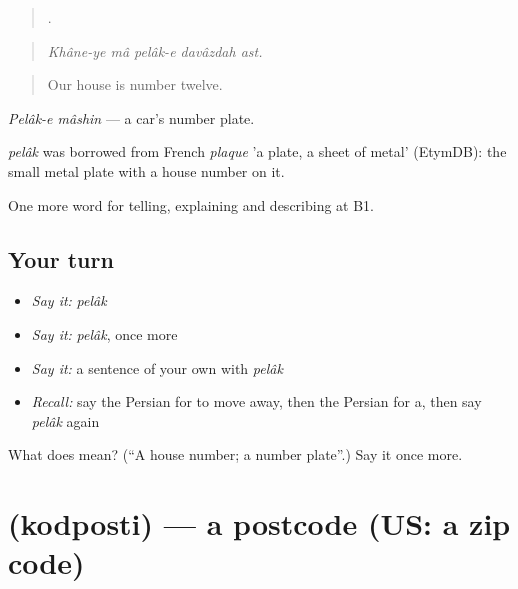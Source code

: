 \begin{quote}
    .
\end{quote}

\begin{quote}
\emph{Khâne-ye mâ pelâk-e davâzdah ast.}
\end{quote}

\begin{quote}
Our house is number twelve.
\end{quote}

\emph{Pelâk-e mâshin} — a car's number plate.

\begin{cousinweb}
\emph{pelâk} was borrowed from French \emph{plaque} 'a plate, a sheet of metal' (EtymDB): the small metal plate with a house number on it.
\end{cousinweb}

\begin{grammarlens}[title={What you've built}]
One more word for telling, explaining and describing at B1.
\end{grammarlens}

\subsection*{Your turn}
\begin{itemize}
\raggedright
  \item \emph{Say it:} \emph{pelâk}
  \item \emph{Say it:} \emph{pelâk}, once more
  \item \emph{Say it:} a sentence of your own with \emph{pelâk}
  \item \emph{Recall:} say the Persian for to move away, then the Persian for a, then say \emph{pelâk} again
\end{itemize}

\begin{tcolorbox}[breakable,colback=teal!4,colframe=teal!35!black,title={Before you move on}]
What does  mean? (\textquotedblleft{}A house number; a number plate\textquotedblright{}.) Say it once more.
\end{tcolorbox}
\section[\texorpdfstring{\fa{کدپستی} (kodposti)}{کدپستی (kodposti)}]{ (kodposti) — a postcode (US: a zip code)}

\label{lesson:FA-C447-kodposti}



